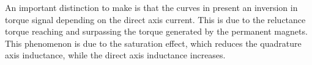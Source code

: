 An important distinction to make is that the curves in  present an inversion in torque signal depending on the direct axis current. This is due to the reluctance torque reaching and surpassing the torque generated by the permanent magnets. This phenomenon is due to the saturation effect, which reduces the quadrature axis inductance, while the direct axis inductance increases.